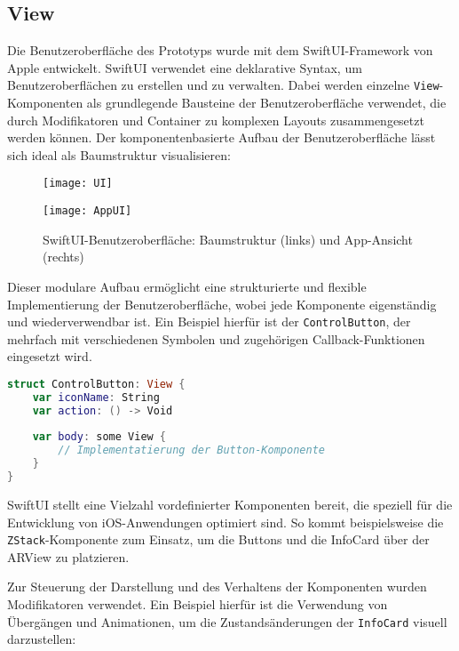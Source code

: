 \subsection{View}

Die Benutzeroberfläche des Prototyps wurde mit dem SwiftUI-Framework von Apple entwickelt. SwiftUI verwendet eine deklarative Syntax, um Benutzeroberflächen zu erstellen und zu verwalten. Dabei werden einzelne \texttt{View}-Komponenten als grundlegende Bausteine der Benutzeroberfläche verwendet, die durch Modifikatoren und Container zu komplexen Layouts zusammengesetzt werden können. Der komponentenbasierte Aufbau der Benutzeroberfläche lässt sich ideal als Baumstruktur visualisieren:

\begin{figure}[h]
    \centering
    \begin{minipage}{0.45\textwidth}
        \centering
        \texttt{[image: UI]}
    \end{minipage}
    \hfill
    \begin{minipage}{0.45\textwidth}
        \centering
        \texttt{[image: AppUI]}
    \end{minipage}
    \caption{SwiftUI-Benutzeroberfläche: Baumstruktur (links) und App-Ansicht (rechts)}
    \label{fig:AppUI}
\end{figure}

Dieser modulare Aufbau ermöglicht eine strukturierte und flexible Implementierung der Benutzeroberfläche, wobei jede Komponente eigenständig und wiederverwendbar ist. Ein Beispiel hierfür ist der \texttt{ControlButton}, der mehrfach mit verschiedenen Symbolen und zugehörigen Callback-Funktionen eingesetzt wird.

\begin{lstlisting}[language=Swift]
struct ControlButton: View {
    var iconName: String
    var action: () -> Void
        
    var body: some View {
        // Implementatierung der Button-Komponente
    }
}
\end{lstlisting}

SwiftUI stellt eine Vielzahl vordefinierter Komponenten bereit, die speziell für die Entwicklung von iOS-Anwendungen optimiert sind. So kommt beispielsweise die \texttt{ZStack}-Komponente zum Einsatz, um die Buttons und die InfoCard über der ARView zu platzieren.

Zur Steuerung der Darstellung und des Verhaltens der Komponenten wurden Modifikatoren verwendet. Ein Beispiel hierfür ist die Verwendung von Übergängen und Animationen, um die Zustandsänderungen der \texttt{InfoCard} visuell darzustellen:

